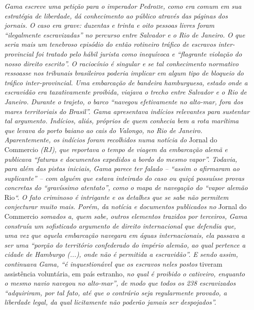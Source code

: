 \begin{didascalia}
\emph{Gama escreve uma petição para o imperador Pedro\textsc{ii}e, como era
comum em sua estratégia de liberdade, dá conhecimento ao público através
das páginas dos jornais. O caso era grave: duzentas e trinta e oito
pessoas livres foram ``ilegalmente escravizadas'' no percurso entre
Salvador e o Rio de Janeiro. O que seria mais um tenebroso episódio do
então rotineiro tráfico de escravos inter-provincial foi tratado pelo
hábil jurista como inequívoca e ``flagrante violação do nosso direito
escrito''. O raciocínio é singular e se tal conhecimento normativo
ressoasse nos tribunais brasileiros poderia implicar em algum tipo de
bloqueio do tráfico inter-provincial. Uma embarcação de bandeira
hamburguesa, estado onde a escravidão era taxativamente proibida,
viajava o trecho entre Salvador e o Rio de Janeiro. Durante o trajeto, o
barco ``navegou efetivamente no alto-mar, fora dos mares territoriais do
Brasil''. Gama apresentava indícios relevantes para sustentar tal
argumento. Indícios, aliás, próprios de quem conhecia bem a rota
marítima que levava do porto baiano ao cais do Valongo, no Rio de
Janeiro. Aparentemente, os indícios foram recolhidos numa notícia do}
Jornal do Commercio \emph{(RJ), que reportava o tempo de viagem da
embarcação alemã e publicava ``faturas e documentos expedidos a bordo do
mesmo vapor''. Todavia, para além das pistas iniciais, Gama parece ter
falado -- ``assim o afirmaram ao suplicante'' -- com alguém que estava
inteirado do caso ou quiçá possuísse provas concretas do ``gravíssimo
atentato'', como o mapa de navegação do ``vapor alemão} Rio\emph{``. O fato
criminoso é intrigante e os detalhes que se sabe não permitem
conjecturar muito mais. Porém, da notícia e documentos publicados no}
Jornal do Commercio \emph{somados a, quem sabe, outros elementos
trazidos por terceiros, Gama construía um sofisticado argumento de
direito internacional que defendia que, uma vez que aquela embarcação
navegara em águas internacionais, ela passava a ser uma ``porção do
território confederado do império alemão, ao qual pertence a cidade de
Hamburgo (...), onde não é permitida a escravidão''. E sendo assim,
continuava Gama, ``é inquestionável que os escravos neles postos} tiveram
assistência voluntária, em país estranho, \emph{no qual é proibido o
cativeiro, enquanto o mesmo navio navegou no alto-mar'', de modo que
todos os 238 escravizados ``adquiriram, por tal fato, até que o contrário
seja regularmente provado, a liberdade legal, da qual licitamente não
poderão jamais ser despojados''.}
\end{didascalia}

